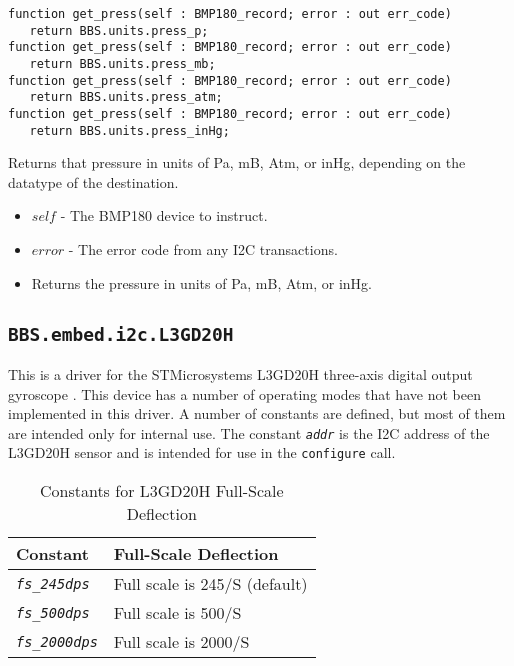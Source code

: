 \documentclass[10pt, openany]{book}
\newcommand{\package}[1]{\texttt{#1}}
\newcommand{\function}[1]{\texttt{#1}}
\newcommand{\constant}[1]{\emph{\texttt{#1}}}
\begin{document}
\begin{lstlisting}
function get_press(self : BMP180_record; error : out err_code)
   return BBS.units.press_p;
function get_press(self : BMP180_record; error : out err_code)
   return BBS.units.press_mb;
function get_press(self : BMP180_record; error : out err_code)
   return BBS.units.press_atm;
function get_press(self : BMP180_record; error : out err_code)
   return BBS.units.press_inHg;
\end{lstlisting}
Returns that pressure in units of Pa, mB, Atm, or inHg, depending on the datatype of the destination.
\begin{itemize}
  \item $self$ - The BMP180 device to instruct.
  \item $error$ - The error code from any I2C transactions.
  \item Returns the pressure in units of Pa, mB, Atm, or inHg.
\end{itemize}

\subsection{\package{BBS.embed.i2c.L3GD20H}}
This is a driver for the STMicrosystems L3GD20H three-axis digital output gyroscope \cite{L3GD20}.  This device has a number of operating modes that have not been implemented in this driver.  A number of constants are defined, but most of them are intended only for internal use.  The constant \constant{addr} is the I2C address of the L3GD20H sensor and is intended for use in the \function{configure} call.

\begin{table}[!h]
\begin{center}
  \begin{tabular}{l|l}
    Constant & Full-Scale Deflection \\
    \hline
    \constant{fs\_245dps} & Full scale is 245\degree{}/S (default) \\
    \constant{fs\_500dps} & Full scale is 500\degree{}/S \\
    \constant{fs\_2000dps} & Full scale is 2000\degree{}/S \\
  \end{tabular}
  \caption{Constants for L3GD20H Full-Scale Deflection}
  \label{tbl:L3GD20HDef}
\end{center}
\end{table}
\end{document}
